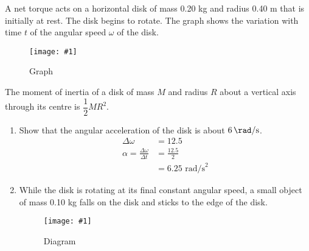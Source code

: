 \documentclass[a4paper,12pt]{article}
\newcommand{\img}[4]{\begin{center}
  \begin{figure}[H]
    \centering
    \texttt{[image: \#1]}
    \caption{#3}
    \label{fig:#4}
  \end{figure}
\end{center}}
\begin{document}
A net torque acts on a horizontal disk of mass 0.20 kg and radius 0.40 m that is initially at rest. The disk begins to rotate. The graph shows the variation with time $t$ of the angular speed $\omega$ of the disk.

\img{ex/5.png}{0.8}{Graph}{graph}

The moment of inertia of a disk of mass $M$ and radius $R$ about a vertical axis through its centre is $\dfrac{1}{2}MR^2$.


\begin{enumerate}[label=(\alph*)]
  \item Show that the angular acceleration of the disk is about $\SI{6}{\rad\per\s}$.
        \begin{align*}
          \Delta \omega                           & = 12.5                 \\
          \alpha = \frac{\Delta \omega}{\Delta t} & = \frac{12.5}{2}       \\
                                                  & = 6.25 \text{ rad/s}^2
        \end{align*}
  \item While the disk is rotating at its final constant angular speed, a small object of mass 0.10 kg falls on the disk and sticks to the edge of the disk.
        \img{ex/6.png}{0.4}{Diagram}{disk}


\end{enumerate}
\end{document}
